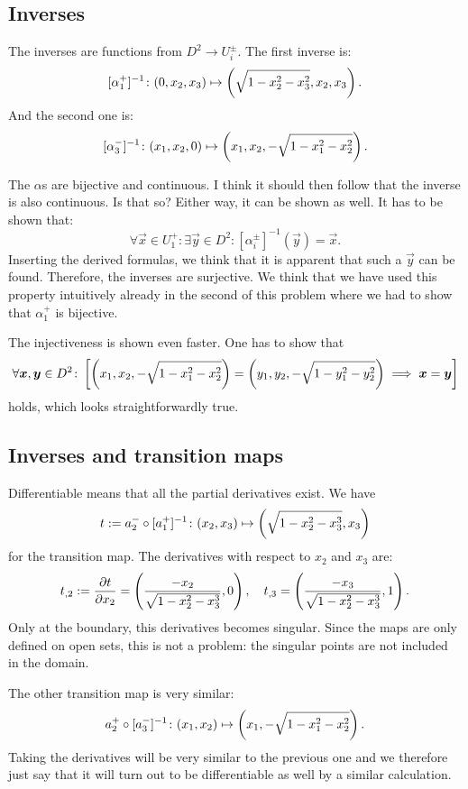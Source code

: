 \documentclass[11pt, english, fleqn, DIV=15, headinclude, BCOR=1cm]{scrartcl}
\begin{document}
\subsection{Inverses}

The inverses are functions from $D^2 \to U_i^\pm$. The first inverse is:
\[
    [\alpha_1^+]^{-1} \colon
    (0, x_2, x_3) \mapsto \left( \sqrt{1 - x_2^2 - x_3^2}, x_2, x_3 \right).
\]
And the second one is:
\[
    [\alpha_3^-]^{-1} \colon
    (x_1, x_2, 0) \mapsto \left( x_1, x_2, -\sqrt{1 - x_1^2 - x_2^2} \right).
\]

The $\alpha$s are bijective and continuous. I think it should then follow that
the inverse is also continuous. Is that so? Either way, it can be shown as
well. It has to be shown that:
\[
    \forall \vec x \in U_1^+ \colon
    \exists \vec y \in D^2 \colon
    [\alpha_i^\pm]^{-1}(\vec y) = \vec x.
\]
Inserting the derived formulas, we think that it is apparent that such a $\vec
y$ can be found. Therefore, the inverses are surjective. We think that we have
used this property intuitively already in the second of this problem where we
had to show that $\alpha_1^+$ is bijective.

The injectiveness is shown even faster. One has to show that
\[
    \forall \boldsymbol{x}, \boldsymbol{y} \in D^2 \colon
    \left[ 
        \left( x_1, x_2, -\sqrt{1 - x_1^2 - x_2^2} \right)
        =
        \left( y_1, y_2, -\sqrt{1 - y_1^2 - y_2^2} \right)
        \implies
        \boldsymbol{x} = \boldsymbol{y}
     \right]
\]
holds, which looks straightforwardly true.

\subsection{Inverses and transition maps}

Differentiable means that all the partial derivatives exist. We have
\[
    t := a_2^- \circ [a_1^+]^{-1} \colon
    (x_2, x_3) \mapsto \left( \sqrt{1-x_2^2 - x_3^3}, x_3 \right)
\]
for the transition map. The derivatives with respect to $x_2$ and $x_3$ are:
\[
    t_{,2} := \frac{\partial {t}}{\partial {x_2}} = \left( \frac{-x_2}{\sqrt{1 - x_2^2 - x_3^3}}, 0 \right)
    ,\quad
    t_{,3} = \left( \frac{-x_3}{\sqrt{1 - x_2^2 - x_3^3}}, 1 \right).
\]
Only at the boundary, this derivatives becomes singular. Since the maps are
only defined on open sets, this is not a problem: the singular points are not
included in the domain.

The other transition map is very similar:
\[
    a_2^+ \circ [a_3^-]^{-1} \colon
    (x_1, x_2) \mapsto \left( x_1, - \sqrt{1 - x_1^2 - x_2^2} \right).
\]
Taking the derivatives will be very similar to the previous one and we
therefore just say that it will turn out to be differentiable as well by a
similar calculation.
\end{document}
